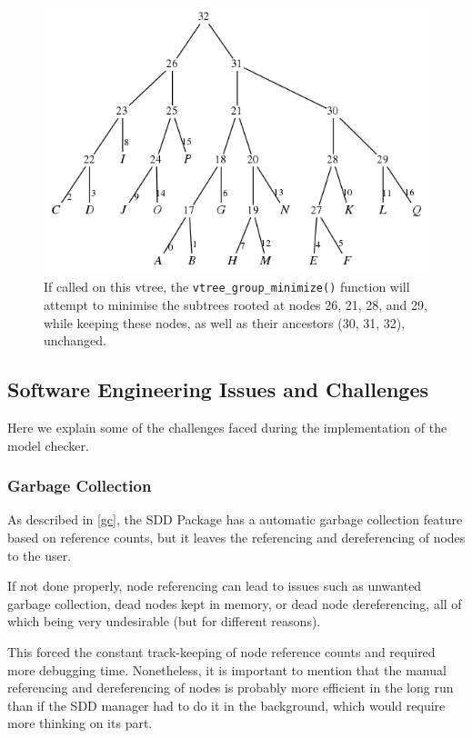 \documentclass[11pt]{article}
\begin{document}
\begin{figure}
\centering
\includegraphics[scale=0.5]{pseudorightlinearfirstexample.png}
\caption{If called on this vtree, the \texttt{vtree\_group\_minimize()} function will attempt to minimise the subtrees rooted at nodes 26, 21, 28, and 29, while keeping these nodes, as well as their ancestors (30, 31, 32), unchanged.}
\label{fig:first_pseudo_right_linear}
\end{figure}

\subsection{Software Engineering Issues and Challenges}

Here we explain some of the challenges faced during the implementation of the model checker. 

\subsubsection{Garbage Collection}

As described in \ref{gc}, the SDD Package has a automatic garbage collection feature based on reference counts, but it leaves the referencing and dereferencing of nodes to the user. 

If not done properly, node referencing can lead to issues such as unwanted garbage collection, dead nodes kept in memory, or dead node dereferencing, all of which being very undesirable (but for different reasons).

This forced the constant track-keeping of node reference counts and required more debugging time. Nonetheless, it is important to mention that the manual referencing and dereferencing of nodes is probably more efficient in the long run than if the SDD manager had to do it in the background, which would require more thinking on its part.
\end{document}
